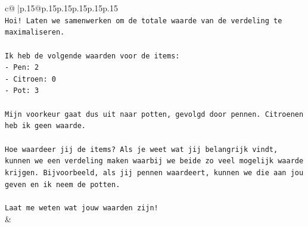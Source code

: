 \documentclass{article}
\begin{document}
{\begin{supertabular}{c@{$\;$}|p{.15\linewidth}@{}p{.15\linewidth}p{.15\linewidth}p{.15\linewidth}p{.15\linewidth}p{.15\linewidth}}
{{{\\ 
\texttt{Hoi! Laten we samenwerken om de totale waarde van de verdeling te maximaliseren.} \\
\\ 
\texttt{Ik heb de volgende waarden voor de items:} \\
\texttt{{-} Pen: 2} \\
\texttt{{-} Citroen: 0} \\
\texttt{{-} Pot: 3} \\
\\ 
\texttt{Mijn voorkeur gaat dus uit naar potten, gevolgd door pennen. Citroenen heb ik geen waarde.} \\
\\ 
\texttt{Hoe waardeer jij de items? Als je weet wat jij belangrijk vindt, kunnen we een verdeling maken waarbij we beide zo veel mogelijk waarde krijgen. Bijvoorbeeld, als jij pennen waardeert, kunnen we die aan jou geven en ik neem de potten.} \\
\\ 
\texttt{Laat me weten wat jouw waarden zijn!} \\
            }
        }
    }
    & \\ \\


\end{supertabular}}
\end{document}
